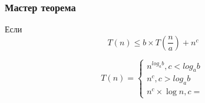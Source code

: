 \begin{Shaded}
\begin{Highlighting}[]
\NormalTok{<}\NormalTok{<}\NormalTok{>) -> }\NormalTok{<}\NormalTok{> }\OperatorTok{\{}
     

       \NormalTok{;}
     

    \OperatorTok{\{}
        \OperatorTok{[}\OperatorTok{]}\OperatorTok{[}\OperatorTok{]}\NormalTok{) }\OperatorTok{\{}
\OperatorTok{[}\OperatorTok{]}\NormalTok{);}
\NormalTok{;}
        \OperatorTok{\}}
         \OperatorTok{\{}
\OperatorTok{[}\OperatorTok{]}\NormalTok{);}
\NormalTok{;}
        \OperatorTok{\}}
    \OperatorTok{\}}

\OperatorTok{\}}

\NormalTok{<}\NormalTok{>) -> }\NormalTok{<}\NormalTok{> }\OperatorTok{\{}
    \NormalTok{;}

    
\OperatorTok{\}}
\end{Highlighting}
\end{Shaded}

\hypertarget{ux43cux430ux441ux442ux435ux440-ux442ux435ux43eux440ux435ux43cux430}{%
\subsubsection{Мастер
теорема}\label{ux43cux430ux441ux442ux435ux440-ux442ux435ux43eux440ux435ux43cux430}}

Если \[
T(n) \leq b\times T \left( \frac{n}{a} \right) + n^c
\]

\[
T(n) = \begin{cases}
n^{log_a b}, c < log_a b \\
n^c, c > log_a b \\
n^c \times {\log n}, c = 
\end{cases}
\]
